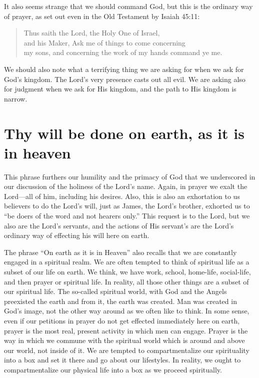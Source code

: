 \documentclass[12pt]{article}
\begin{document}
It also seems strange that we should command God, but this is the ordinary way of prayer, as set out even in the Old Testament by Isaiah 45:11:
\begin{quote}
Thus saith the Lord, the Holy One of Israel, \\
and his Maker, Ask me of things to come concerning \\
my sons, and concerning the work of my hands command ye me.
\end{quote}

We should also note what a terrifying thing we are asking for when we ask for God's kingdom.  The Lord's very presence casts out all evil.  We are asking also for judgment when we ask for His kingdom, and the path to His kingdom is narrow.

\section{Thy will be done on earth, as it is in heaven}

This phrase furthers our humility and the primacy of God that we underscored in our discussion of the holiness of the Lord's name.  Again, in prayer we exalt the Lord---all of him, including his desires.  Also, this is also an exhortation to us believers to do the Lord's will, just as James, the Lord's brother, exhorted us to ``be doers of the word and not hearers only.''  This request is to the Lord, but we also are the Lord's servants, and the actions of His servant's are the Lord's ordinary way of effecting his will here on earth.

The phrase ``On earth as it is in Heaven'' also recalls that we are constantly engaged in a spiritual realm.  We are often tempted to think of spiritual life as a subset of our life on earth.  We think, we have work, school, home-life, social-life, and then prayer or spiritual life.  In reality, all those other things are a subset of our spiritual life.  The so-called spiritual world, with God and the Angels preexisted the earth and from it, the earth was created.  Man was created in God's image, not the other way around as we often like to think.  In some sense, even if our petitions in prayer do not get effected immediately here on earth, prayer is the most real, present activity in which men can engage.  Prayer is the way in which we commune with the spiritual world which is around and above our world, not inside of it.  We are tempted to compartmentalize our spirituality into a box and set it there and go about our lifestyles.  In reality, we ought to compartmentalize our physical life into a box as we proceed spiritually.
\end{document}
